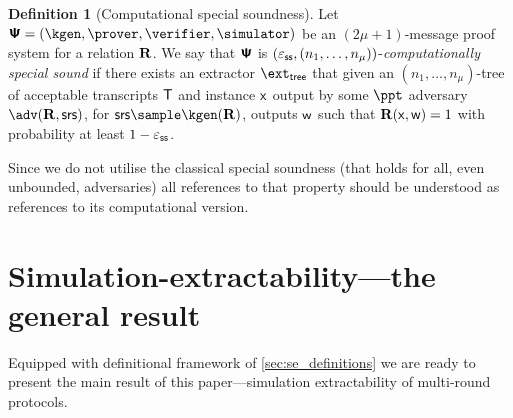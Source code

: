 \documentclass[runningheads,11pt]{llncs}
\theoremstyle{definition} \newtheorem{definition}[theorem]{Definition}
\begin{document}
\begin{definition}[Computational special soundness]
  Let $\proofsystem = (\kgen, \prover, \verifier, \simulator)$ be an
  $(2 \mu + 1)$-message proof system for a relation $\mathbf{R}$. We say that
  $\bm{\mathsf{\Psi}}$ is $(\varepsilon_{\mathsf{ss}}, (n_1, \ldots, n_\mu))$-\emph{computationally special sound}
  if there exists an extractor $\extt$ that given an $(n_1, \ldots, n_\mu)$-tree
  of acceptable transcripts $\mathsf{T}$ and instance $\mathsf{x}$ output by some $\ppt$ adversary $\adv(\REL,
  \srs)$, for $\srs \sample \kgen(\REL)$, outputs $\mathsf{w}$ such that $\mathbf{R}(\mathsf{x},
  \mathsf{w}) = 1$ with probability at least $1 - \varepsilon_{\mathsf{ss}}$.
\end{definition}

Since we do not utilise the classical special soundness (that holds for all,
even unbounded, adversaries) all references to that property should be
understood as references to its computational version.

\section{Simulation-extractability---the general result}
Equipped with definitional framework of \cref{sec:se_definitions} we are ready
to present the main result of this paper---simulation extractability of
multi-round protocols.
\end{document}

